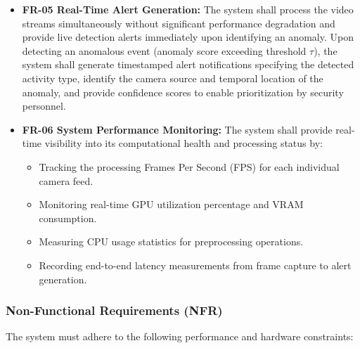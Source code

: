 \documentclass[12pt]{article}
\begin{document}
\begin{itemize}
    \item \textbf{FR-05 Real-Time Alert Generation:}
    The system shall process the video streams simultaneously without significant performance degradation and provide live detection alerts immediately upon identifying an anomaly. Upon detecting an anomalous event (anomaly score exceeding threshold $\tau$), the system shall generate timestamped alert notifications specifying the detected activity type, identify the camera source and temporal location of the anomaly, and provide confidence scores to enable prioritization by security personnel.

    \item \textbf{FR-06 System Performance Monitoring:} 
    The system shall provide real-time visibility into its computational health and processing status by:
    \begin{itemize}
        \item Tracking the processing Frames Per Second (FPS) for each individual camera feed.
        \item Monitoring real-time GPU utilization percentage and VRAM consumption.
        \item Measuring CPU usage statistics for preprocessing operations.
        \item Recording end-to-end latency measurements from frame capture to alert generation.
    \end{itemize}
\end{itemize}

\subsubsection{Non-Functional Requirements (NFR)}
The system must adhere to the following performance and hardware constraints:
\end{document}
